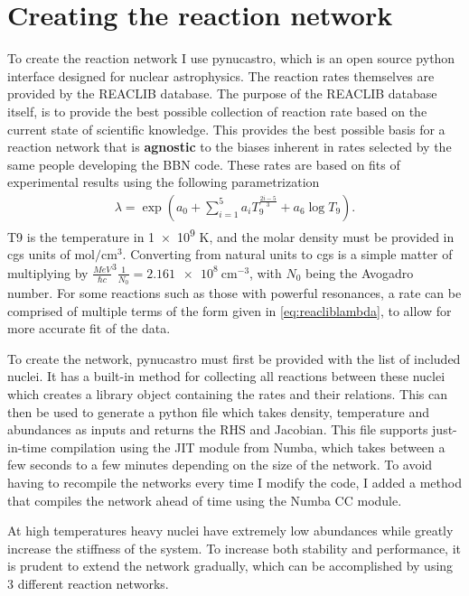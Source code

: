 \section{Creating the reaction network}
\label{sec:pna}
To create the reaction network I use pynucastro\cite{pynucastro2}, which is an open source python interface designed for nuclear astrophysics. The reaction rates themselves are provided by the REACLIB database\cite{REACLIB}. The purpose of the REACLIB database itself, is to provide the best possible collection of reaction rate based on the current state of scientific knowledge. This provides the best possible basis for a reaction network that is \textbf{agnostic} to the biases inherent in rates selected by the same people developing the BBN code. These rates are based on fits of experimental results using the following parametrization 
\begin{align}
    \lambda = \exp\left(a_0+\sum_{i=1}^{5}a_i T_9^{\frac{2i-5}{3}}+a_6 \log{T_9}\right).
    \label{eq:reacliblambda}
\end{align}
T9 is the temperature in \num{1e9} K, and the molar density must be provided in cgs units of $\text{mol}/\text{cm}^3$. Converting from natural units to cgs is a simple matter of multiplying by $\frac{MeV}{\hbar c}^3\frac{1}{N_0}=\SI{2.161e8}{\cm^{-3}}$, with $N_0$ being the Avogadro number. For some reactions such as those with powerful resonances, a rate can be comprised of multiple terms of the form given in \eqref{eq:reacliblambda}, to allow for more accurate fit of the data. 

To create the network, pynucastro must first be provided with the list of included nuclei. It has a built-in method for collecting all reactions between these nuclei which creates a library object containing the rates and their relations. This can then be used to generate a python file which takes density, temperature and abundances as inputs and returns the RHS and Jacobian. This file supports just-in-time compilation using the JIT module from Numba, which takes between a few seconds to a few minutes depending on the size of the network. To avoid having to recompile the networks every time I modify the code, I added a method that compiles the network ahead of time using the Numba CC module. 

At high temperatures heavy nuclei have extremely low abundances while greatly increase the stiffness of the system. To increase both stability and performance, it is prudent to extend the network gradually, which can be accomplished by using 3 different reaction networks. 

